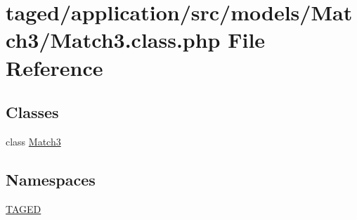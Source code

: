 \hypertarget{_match3_8class_8php}{}\section{taged/application/src/models/\+Match3/\+Match3.class.\+php File Reference}
\label{_match3_8class_8php}
\subsection*{Classes}
\begin{DoxyCompactItemize}
\item 
class \hyperlink{class_match3}{Match3}
\end{DoxyCompactItemize}
\subsection*{Namespaces}
\begin{DoxyCompactItemize}
\item 
 \hyperlink{namespace_t_a_g_e_d}{T\+A\+G\+ED}
\end{DoxyCompactItemize}
